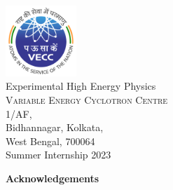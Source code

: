 \documentclass{article}
\begin{document}
\begin{titlepage}
\begin{center}
    \includegraphics[width=0.2\textwidth]{VECC.png}\\[0.1in]
    \Large{Experimental High Energy Physics}\\
    \normalsize
    \textsc{Variable Energy Cyclotron Centre}\\
    1/AF, \\Bidhannagar, Kolkata, \\West Bengal, 700064 \\
    \vspace{0.2in}
    Summer Internship 2023
    
    \end{center}
    
\end{titlepage}
\restoregeometry









\cleardoublepage
\begin{center}
    \Large{\textbf{Acknowledgements}}
\end{center}
\end{document}
